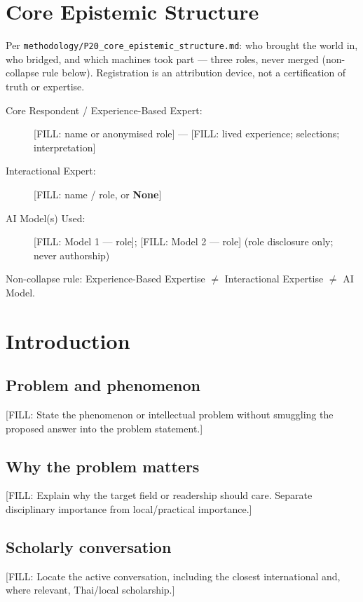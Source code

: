 \documentclass[11pt]{article}
\begin{document}
\section*{Core Epistemic Structure}
\label{sec:ces}
Per \texttt{methodology/P20\_core\_epistemic\_structure.md}: who brought the world in, who bridged,
and which machines took part --- three roles, never merged (non-collapse rule below). Registration
is an attribution device, not a certification of truth or expertise.
\begin{description}
  \item[Core Respondent / Experience-Based Expert:] [FILL: name or anonymised role] ---
    [FILL: lived experience; selections; interpretation]
  \item[Interactional Expert:] [FILL: name / role, or \textbf{None}]
  \item[AI Model(s) Used:] [FILL: Model 1 --- role]; [FILL: Model 2 --- role] (role disclosure only; never authorship)
\end{description}
Non-collapse rule: Experience-Based Expertise $\neq$ Interactional Expertise $\neq$ AI Model.

\section{Introduction}
\label{sec:s1}

%

\subsection{Problem and phenomenon}
[FILL: State the phenomenon or intellectual problem without smuggling the
proposed answer into the problem statement.]

\subsection{Why the problem matters}
[FILL: Explain why the target field or readership should care. Separate
disciplinary importance from local/practical importance.]

\subsection{Scholarly conversation}
[FILL: Locate the active conversation, including the closest international
and, where relevant, Thai/local scholarship.]
\end{document}
